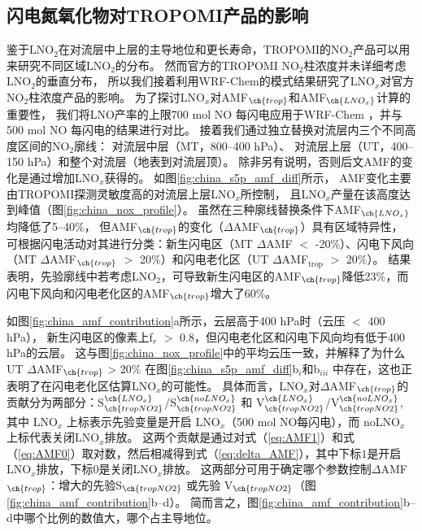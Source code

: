 \subsection{闪电氮氧化物对TROPOMI产品的影响}  \label{sec:lnox_affects_tropomi}

鉴于LNO$_2$在对流层中上层的主导地位和更长寿命，TROPOMI的NO$_2$产品可以用来研究不同区域LNO$_2$的分布。
然而官方的TROPOMI NO$_2$柱浓度并未详细考虑LNO$_2$的垂直分布，
所以我们接着利用WRF-Chem的模式结果研究了LNO$_x$对官方NO$_2$柱浓度产品的影响。
为了探讨LNO$_x$对AMF$_{\ch{trop}}$和AMF$_{\ch{LNO_x}}$计算的重要性，
我们将LNO产率的上限700 mol NO 每闪电\citep{Ott.2010}应用于WRF-Chem ，并与500 mol NO 每闪电的结果进行对比。
接着我们通过独立替换对流层内三个不同高度区间的NO$_2$廓线：
对流层中层（MT，800--400 hPa）、
对流层上层（UT，400--150 hPa）和整个对流层（地表到对流层顶）。
除非另有说明，否则后文AMF的变化是通过增加LNO$_x$获得的。
如图\ref{fig:china_s5p_amf_diff}所示，
AMF变化主要由TROPOMI探测灵敏度高的对流层上层LNO$_x$所控制\citep{Beirle.2009,Laughner.2017}，
且LNO$_x$产量在该高度达到峰值（图\ref{fig:china_nox_profile}）。
虽然在三种廓线替换条件下AMF$_{\ch{LNO_x}}$均降低了5--40\%，
但AMF$_{\ch{trop}}$的变化（$\Delta$AMF$_{\ch{trop}}$）具有区域特异性，
可根据闪电活动对其进行分类：新生闪电区（MT $\Delta$AMF $<$ -20\%）、闪电下风向（MT $\Delta$AMF$_{\ch{trop}}$ $>$ 20\%）和闪电老化区（UT $\Delta$AMF$_\textrm{trop}$ $>$ 20\%）。
结果表明，先验廓线中若考虑LNO$_2$，可导致新生闪电区的AMF$_{\ch{trop}}$降低23\%，而闪电下风向和闪电老化区的AMF$_{\ch{trop}}$增大了60\%。

如图\ref{fig:china_amf_contribution}a所示，云层高于400 hPa时（云压 $<$ 400 hPa），
新生闪电区的像素上f$_r$ $>$ 0.8，但闪电老化区和闪电下风向均有低于400 hPa的云层。
这与图\ref{fig:china_nox_profile}中的平均云压一致，并解释了为什么UT $\Delta$AMF$_{\ch{trop}}$ > 20\% 在图\ref{fig:china_s5p_amf_diff}b$_i$和b$_{iii}$ 中存在，这也正表明了在闪电老化区估算LNO$_x$的可能性。
具体而言，LNO$_x$对$\Delta$AMF$_{\ch{trop}}$的贡献分为两部分：S$^{\ch{LNO_x}}_{\ch{tropNO2}}$/S$^{\ch{noLNO_x}}_{\ch{tropNO2}}$ 和 V$^{\ch{LNO_x}}_{\ch{tropNO2}}$/V$^{\ch{noLNO_x}}_{\ch{tropNO2}}$,
其中 LNO$_x$ 上标表示先验变量是开启 LNO$_x$（500 mol NO每闪电），而 noLNO$_x$ 上标代表关闭LNO$_x$排放。
这两个贡献是通过对式（\ref{eq:AMF1}）和式（\ref{eq:AMF0}）取对数，然后相减得到式（\ref{eq:delta_AMF}），其中下标$1$是开启LNO$_x$排放，下标$0$是关闭LNO$_x$排放。
这两部分可用于确定哪个参数控制$\Delta$AMF$_{\ch{trop}}$：增大的先验S$_{\ch{tropNO2}}$ 或先验 V$_{\ch{tropNO2}}$（图\ref{fig:china_amf_contribution}b--d）。
简而言之，图\ref{fig:china_amf_contribution}b--d中哪个比例的数值大，哪个占主导地位。

